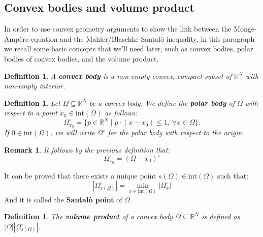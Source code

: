 \documentclass{article}
\newtheorem{definition}[theorem]{Definition}
\newtheorem{remark}[theorem]{Remark}
\numberwithin{equation}{section}
\begin{document}
\subsection{Convex bodies and volume product}
In order to use convex geometry arguments to show the link between the Monge-Ampère equation and the Mahler/Blaschke-Santalò inequality, in this paragraph we recall some basic concepts that we'll need later, such as convex bodies, polar bodies of convex bodies, and the volume product.
\begin{definition}\label{def:cbody}
    A \textbf{convex body} is a non-empty convex, compact subset of $\mathbb{R}^N$ with non-empty interior.
\end{definition}

\begin{definition}
    Let $\Omega \subseteq \mathbb{R}^N$ be a convex body. We define the \textbf{polar body} of $\Omega$ with respect to a point $x_0 \in \text{int}(\Omega)$ as follows:
    \begin{equation}\label{eq:polar}
    \Omega^\circ_{x_0} = \{p \in \mathbb{R}^N \mid p \cdot (x-x_0) \leq 1, \, \forall x \in \Omega\}.
    \end{equation}
    If $0 \in \text{int}(\Omega)$, we will write $\Omega^\circ$ for the polar body with respect to the origin.
\end{definition}

\begin{remark}
    It follows by the previous definition that:
    \[
    \Omega^\circ_{x_0} = (\Omega-x_0)^\circ
    \]
\end{remark}

\noindent It can be proved that there exists a unique point $s(\Omega) \in \text{int}(\Omega)$ such that:
\[
|\Omega^\circ_{s(\Omega)}| = \min_{x \in \text{int}(\Omega)} |\Omega^\circ_x|
\]
And it is called the \textbf{Santalò point} of $\Omega$.

\begin{definition}
    The \textbf{volume product} of a convex body $\Omega \subseteq \mathbb{R}^N$ is defined as $|\Omega||\Omega^\circ_{s(\Omega)}|$.
\end{definition}
\end{document}

